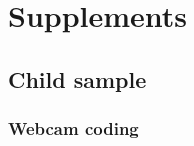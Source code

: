 \documentclass[
  man,floatsintext]{apa6}
\begin{document}
\endgroup

\newpage

\hypertarget{supplements}{%
\section{Supplements}\label{supplements}}

\hypertarget{child-sample}{%
\subsection{Child sample}\label{child-sample}}

\hypertarget{webcam-coding}{%
\subsubsection{Webcam coding}\label{webcam-coding}}
\end{document}

